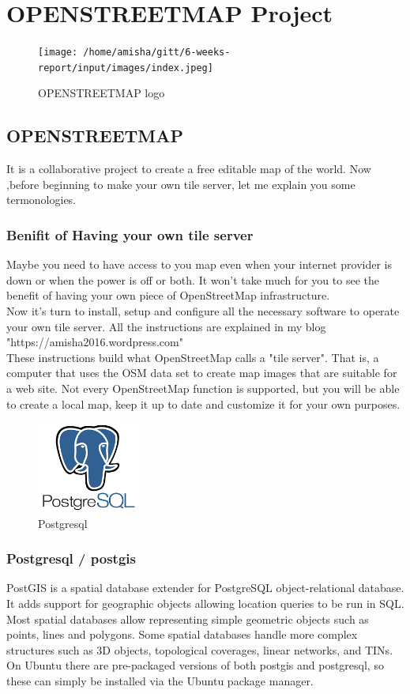 \chapter{OPENSTREETMAP Project}
\begin{figure}[ht]
\centering \texttt{[image: /home/amisha/gitt/6-weeks-report/input/images/index.jpeg]}
\caption{OPENSTREETMAP logo}
\end{figure}
\section{OPENSTREETMAP}
It is a collaborative project to create a free editable map of the world.
Now ,before beginning to make your own tile server, let me explain you some termonologies.
\subsection{Benifit of Having your own tile server}
Maybe you need to have access to you map even when your internet provider is down or when the power is off or both. It won't take much for you to see the benefit of having your own piece of OpenStreetMap infrastructure.\\
Now it's turn to install, setup and configure all the necessary software to operate your own tile server. All the instructions are explained in my blog "https://amisha2016.wordpress.com"\\
These instructions build what OpenStreetMap calls a "tile server". That is, a computer that uses the OSM data set to create map images that are suitable for a web site. Not every OpenStreetMap function is supported, but you will be able to create a local map, keep it up to date and customize it for your own purposes.
\begin{figure}[!ht]
\centering
\includegraphics[width=0.3\textwidth]{input/images/index.png}                   
\caption{Postgresql}
\hspace{-1.5em}
\end{figure}


\subsection{Postgresql / postgis}
PostGIS is a spatial database extender for PostgreSQL object-relational database. It adds support for geographic objects allowing location queries to be run in SQL.\\
Most spatial databases allow representing simple geometric objects such as points, lines and polygons. Some spatial databases handle more complex structures such as 3D objects, topological coverages, linear networks, and TINs.\\
On Ubuntu there are pre-packaged versions of both postgis and postgresql, so these can simply be installed via the Ubuntu package manager.\\
